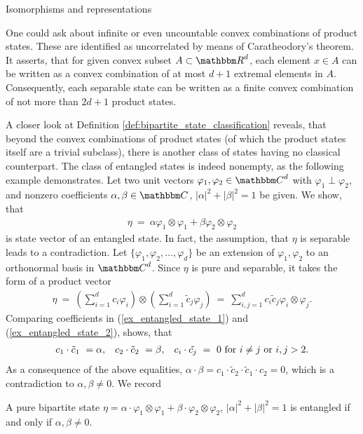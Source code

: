 \begin{subsection}{Isomorphisms and representations}
   \begin{remark}
    One could ask about infinite or even uncountable convex combinations of product states. These are identified as uncorrelated by means of Caratheodory's theorem. 
    It asserts, that for given convex subset $A \subset \bbmR^d$, each element $x \in A$ can be written as a convex combination of at most $d+1$ extremal elements in 
    $A$. Consequently, each separable state can be written as a finite convex combination of not more than $2d+1$ product states. 
   \end{remark}
   A closer look at Definition \ref{def:bipartite_state_classification} reveals, that beyond the convex combinations of product states (of which the product states itself are a trivial
   subclass), there is another class of states having no classical counterpart. The class of entangled states is indeed nonempty, as the following example demonstrates.
	Let two unit vectors $\varphi_1, \varphi_2 \in \bbmC^d$ with $\varphi_1 \perp \varphi_2$, and nonzero coefficients $\alpha, \beta \in \bbmC$, $|\alpha|^2 + |\beta|^2 = 1$ be given. We
	show, that 
	\begin{align}
	\eta  \ = \ \alpha \varphi_1 \otimes \varphi_1 + \beta \varphi_2 \otimes \varphi_2 \label{ex_entangled_state_1}
	\end{align}
    is state vector of an entangled state. In fact, the assumption, that $\eta$ is separable leads to a contradiction. Let $\{\varphi_1,\varphi_2,\dots,\varphi_d\}$ be an extension of $\varphi_1,\varphi_2$ to an orthonormal basis in $\bbmC^d$. Since $\eta$ is pure and separable, it takes the form of a product vector
    \begin{align}
     \eta \ = \ \left(\sum_{i=1}^d c_i \varphi_i \right) \otimes \left(\sum_{i=1}^d \tilde{c}_j \varphi_j\right) \ = \ \sum_{i,j=1}^d c_i \tilde{c}_j \varphi_i \otimes \varphi_j.
     \label{ex_entangled_state_2}
    \end{align}
    Comparing coefficients in (\ref{ex_entangled_state_1}) and (\ref{ex_entangled_state_2}), shows, that 
    \begin{align}
     c_1 \cdot \tilde{c}_1 \ = \alpha, \hspace{.3cm} c_2 \cdot \tilde{c}_2 \ = \beta, \hspace{.3cm} c_i \cdot \tilde{c_j} \ = \ 0 \ \text{for} \  i \neq j \ \text{or} \ i,j > 2.
    \end{align}
    As a consequence of the above equalities, $\alpha \cdot \beta = c_1 \cdot \tilde{c}_2 \cdot \tilde{c}_1 \cdot c_2  = 0$, which is a contradiction to $\alpha, \beta \neq 0$. We record
   \begin{example}
	A pure bipartite state $\eta = \alpha \cdot \varphi_1 \otimes \varphi_1 + \beta \cdot \varphi_2 \otimes \varphi_2$, $|\alpha|^2 + |\beta|^2 = 1$ is entangled if and only if $\alpha, \beta \neq 0$.
   \end{example}

	\end{subsection}
